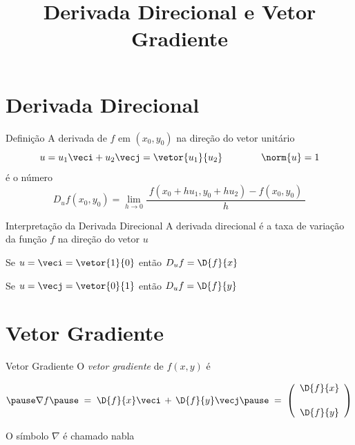 \documentclass[fleqn,utf8,aspectratio=169,12pt,ignorenonframetext]{beamer}
\title{Derivada Direcional e Vetor Gradiente}
\begin{document}
\addtitle

\section{Derivada Direcional}


\begin{frame}{Definição}
  A derivada de $f$ em $(x_0, y_0)$
  \pause
  na direção do vetor unitário
  \[
    u
    = u_1 \veci + u_2 \vecj
    = \vetor{u_1}{u_2}
    \qquad
    \qquad
    \norm{u} = 1
  \]
  \pause
  é o número
  \[
    D_u f(x_0, y_0)
    = \lim_{h\to 0} \frac{\;f( x_0 + hu_1, y_0 + hu_2)-f(x_0, y_0)\;}{h}
  \]
\end{frame}


\begin{frame}{Interpretação da Derivada Direcional}
  A derivada direcional é a taxa de variação da função $f$ na direção do vetor $u$

  \pause
  \vspace{\baselineskip}
  Se \(u=\veci=\vetor{1}{0}\)
  \pause
  então
  \(
    D_u f = \D{f}{x}
  \)

  \pause
  \vspace{\baselineskip}
  Se \(u=\vecj=\vetor{0}{1}\)
  \pause
  então
  \(
    D_u f = \D{f}{y}
  \)
\end{frame}



\section{Vetor Gradiente}

\begin{frame}{Vetor Gradiente}
  O \emph{vetor gradiente} de $f(x, y)$ é

  \[
    \pause
    \nabla f
    \pause
    \;=\; \D{f}{x}\veci \,+\, \D{f}{y}\vecj
    \pause
    \;=\; \left(\begin{array}{c}
            \displaystyle\D{f}{x} \\[5mm]
            \displaystyle\D{f}{y}
          \end{array}\right)
  \]

  \pause
  O símbolo \(\nabla\) é chamado nabla
\end{frame}
\end{document}
